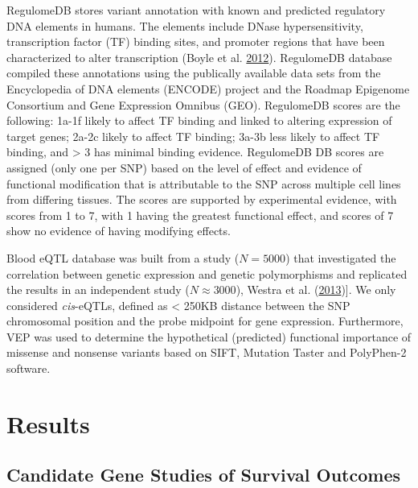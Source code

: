 \documentclass[]{DissertateOSU}
\begin{document}
RegulomeDB stores variant annotation with known and predicted regulatory
DNA elements in humans. The elements include DNase hypersensitivity,
transcription factor (TF) binding sites, and promoter regions that have
been characterized to alter transcription (Boyle et al.
\protect\hyperlink{ref-Boyle_2012}{2012}). RegulomeDB database compiled
these annotations using the publically available data sets from the
Encyclopedia of DNA elements (ENCODE) project and the Roadmap Epigenome
Consortium and Gene Expression Omnibus (GEO). RegulomeDB scores are the
following: 1a-1f likely to affect TF binding and linked to altering
expression of target genes; 2a-2c likely to affect TF binding; 3a-3b
less likely to affect TF binding, and \textgreater{} 3 has minimal
binding evidence. RegulomeDB DB scores are assigned (only one per SNP)
based on the level of effect and evidence of functional modification
that is attributable to the SNP across multiple cell lines from
differing tissues. The scores are supported by experimental evidence,
with scores from 1 to 7, with 1 having the greatest functional effect,
and scores of 7 show no evidence of having modifying effects.

Blood eQTL database was built from a study (\(N=5000\)) that
investigated the correlation between genetic expression and genetic
polymorphisms and replicated the results in an independent study
(\(N \approx 3000\)), Westra et al.
(\protect\hyperlink{ref-westra_2013}{2013}){]}. We only considered
\emph{cis}-eQTLs, defined as \textless{} 250KB distance between the SNP
chromosomal position and the probe midpoint for gene expression.
Furthermore, VEP was used to determine the hypothetical (predicted)
functional importance of missense and nonsense variants based on SIFT,
Mutation Taster and PolyPhen-2 software.

\section{Results}\label{results}

\subsection{Candidate Gene Studies of Survival
Outcomes}\label{candidate-gene-studies-of-survival-outcomes}
\end{document}
